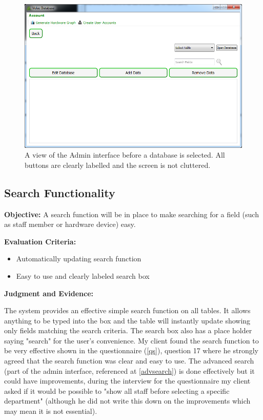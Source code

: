\begin{figure}[H]
    \includegraphics[width=\textwidth]{./Evaluation/Images/clearlabels.png}
    \caption{A view of the Admin interface before a database is selected. All buttons are clearly labelled and the screen is not cluttered.} 
\end{figure}

\subsection{Search Functionality}\label{searchf}

\textbf{Objective:} A search function will be in place to make searching for a field (such as staff member or hardware device) easy.

\textbf{Evaluation Criteria:}
\begin{itemize}
\item{Automatically updating search function}
\item{Easy to use and clearly labeled search box}
\end{itemize}

\textbf{Judgment and Evidence:}

The system provides an effective simple search function on all tables. It allows anything to be typed into the box and the table will instantly update showing only fields matching the search criteria. The search box also has a place holder saying "search" for the user's convenience. My client found the search function to be very effective shown in the questionnaire (\ref{qs}), question 17 where he strongly agreed that the search function was clear and easy to use. The advanced search (part of the admin interface, referenced at \ref{advsearch}) is done effectively but it could have improvements, during the interview for the questionnaire my client asked if it would be possible to "show all staff before selecting a specific department" (although he did not write this down on the improvements which may mean it is not essential).

